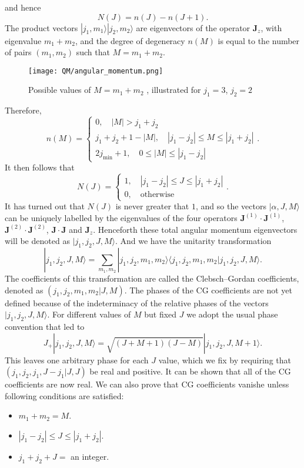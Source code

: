 and hence
\[N(J) = n(J) - n(J+1).\]
The product vectors $|j_1,m_1\rangle |j_2,m_2\rangle$ are eigenvectors of the operator $\bm{J}_z$, with eigenvalue $m_1+m_2$, and the degree of degeneracy $n(M)$ is equal to the number of pairs $(m_1,m_2)$ such that $M=m_1+m_2$.
\begin{figure}[!h]
	\centering
	\texttt{[image: QM/angular\_momentum.png]}
	\caption{Possible values of $M=m_1+m_2$ , illustrated for $j_1=3$, $j_2=2$}
\end{figure}
Therefore,
\[n(M)=\begin{cases} 0 , \quad |M| > j_1 + j_2\\ j_1+j_2+1-|M|, \quad |j_1-j_2| \leq M \leq |j_1+j_2|\\ 2j_{\mathrm{min}}+1 , \quad 0 \leq |M|\leq |j_1-j_2|\end{cases} .\]
It then follows that
\[N(J)=\begin{cases} 1 , \quad |j_1-j_2| \leq J \leq |j_1+j_2|\\ 0 , \quad \mbox{otherwise}\end{cases} .\]
It has turned out that $N(J)$ is never greater that $1$, and so the vectors $|\alpha, J, M \rangle$ can be uniquely labelled by the eigenvalues of the four operators $\bm{J}^{(1)}\cdot\bm{J}^{(1)}$, $\bm{J}^{(2)}\cdot\bm{J}^{(2)}$, $\bm{J}\cdot\bm{J}$ and $\bm{J}_z$. Henceforth these total angular momentum
eigenvectors will be denoted as $|j_1,j_2,J,M\rangle$. And we have the unitarity transformation 
\[|j_1,j_2,J,M\rangle = \sum_{m_1,m_2} |j_1,j_2,m_1,m_2\rangle \langle j_1,j_2,m_1,m_2 | j_1,j_2,J,M\rangle.\]
The coefficients of this transformation are called the Clebsch–Gordan coefficients, denoted as $(j_1,j_2,m_1,m_2|J,M)$.
The phases of the CG coefficients are not yet defined because of the indeterminacy of the relative phases of the vectors $|j_1,j_2,J,M\rangle$. For different values of $M$ but fixed $J$ we adopt the usual phase convention that led to
\[J_+ |j_1,j_2,J,M\rangle = \sqrt{(J+M+1)(J-M)} |j_1,j_2,J,M+1\rangle.\]
This leaves one arbitrary phase for each $J$ value, which we fix by requiring that $(j_1,j_2,j_1,J-j_1|J,J)$ be real and positive. It can be shown that all of the CG coefficients are now real.
We can also prove that CG coefficients vanishe unless following conditions are satisfied:
\begin{itemize}
\item $m_1+m_2=M$.
\item $|j_1-j_2| \leq J \leq |j_1+j_2|$.
\item $j_1+j_2+J =$ an integer.
\end{itemize}
